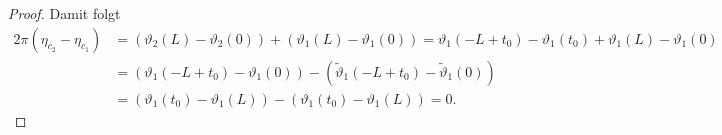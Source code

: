 \documentclass[11pt]{scrbook}
\newcommand{\tta}{\vartheta}
\begin{document}
\begin{lem}
\begin{proof}
Damit folgt
\begin{align*}
 2 \pi (\eta_{c_2} - \eta_{c_1})  &= (\tta_2(L) - \tta_2(0)) + (\tta_1(L) - \tta_1(0)) = \tta_1(-L + t_0) - \tta_1(t_0) + \tta_1(L) - \tta_1(0)  \\
& =  (\tta_1(-L+t_0) - \tta_1(0)) - (\tilde \tta_1(-L+t_0) - \tilde \tta_1(0)) \\ 
&= (\tta_1(t_0) -\tta_1(L)) - (\tta_1(t_0) - \tta_1(L))  = 0.
\end{align*}
\end{proof}
\end{lem}


\end{document}
